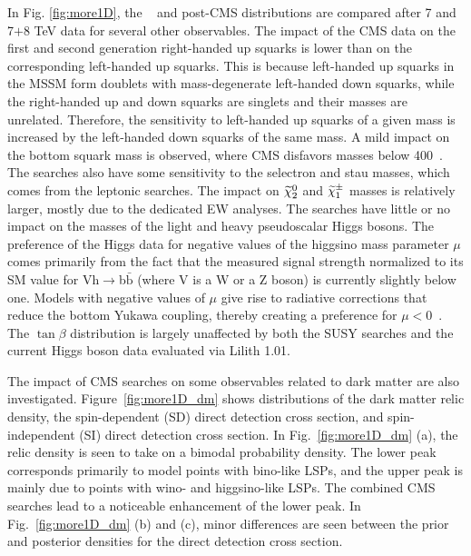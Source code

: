 
In Fig. \ref{fig:more1D}, the  \preCMS~ and post-CMS distributions are
compared after 7 and 7$+$8 TeV data for several other
observables.  The impact of the CMS data on the
first and second generation right-handed up squarks is lower than on the
corresponding left-handed up squarks. This is because left-handed up squarks in
the MSSM form doublets with mass-degenerate left-handed down squarks, while
the right-handed up and down squarks are singlets and their
masses are unrelated.  Therefore, the 
sensitivity to left-handed up squarks of a given mass is increased by the left-handed down squarks of the same mass.  A mild impact on the bottom
squark mass is observed, where CMS disfavors masses below 400~\GeV.  The
searches also have some sensitivity to the selectron and stau masses,
which comes from the leptonic searches.  The impact on $\widetilde{\chi}^0_2$ and
$\widetilde{\chi}^\pm_1$ masses is relatively larger, mostly due to the dedicated EW
analyses. The searches have little or no impact on the masses of the light and heavy pseudoscalar Higgs
bosons. The preference of the Higgs data for negative values of the higgsino mass parameter $\mu$ comes primarily from the fact that the measured signal 
strength normalized to its SM value for Vh$\to$b$\bar{\text{b}}$ (where V is a W or a Z boson) is currently slightly below one. Models with negative values of $\mu$ give rise to radiative corrections that reduce the bottom Yukawa coupling, thereby creating a preference for $\mu<0$~\cite{Dumont:2013npa}. The $\tan\beta$ distribution is largely unaffected by both the SUSY searches and the current Higgs boson data evaluated via {\sc Lilith} 1.01. 

The impact of CMS searches on some observables
related to dark matter are also investigated. Figure~\ref{fig:more1D_dm}  shows distributions of the
dark matter relic density, the spin-dependent (SD) direct detection cross section,
and spin-independent (SI) direct detection cross section. In Fig.~\ref{fig:more1D_dm} (a),
 the relic density is seen to take on a bimodal probability density.
The lower peak corresponds primarily to model points with bino-like LSPs,
and the upper peak is mainly due to points with wino- and higgsino-like LSPs. The combined CMS searches lead to a noticeable enhancement of the lower peak. In Fig.~\ref{fig:more1D_dm} (b) and (c), minor differences are seen between the prior and posterior densities for the direct detection cross section.

